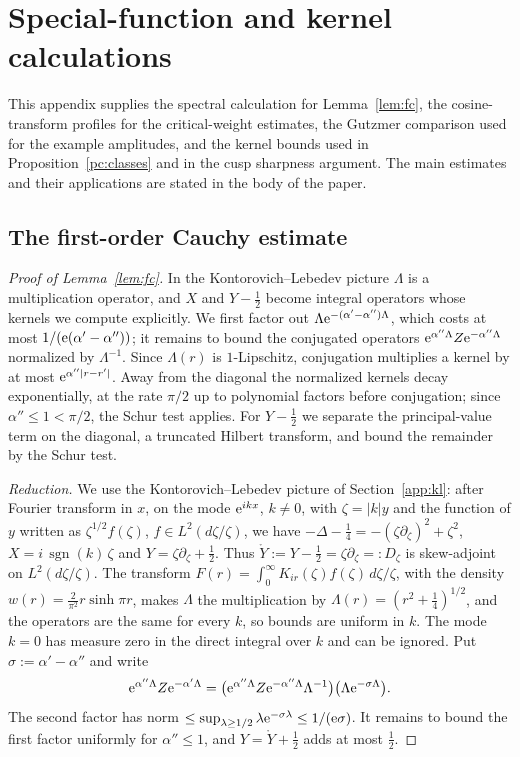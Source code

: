 \section{Special-function and kernel calculations}\label{app:special}
This appendix supplies the spectral calculation for Lemma~\ref{lem:fc}, the cosine-transform profiles
for the critical-weight estimates, the Gutzmer comparison used for the example amplitudes,
and the kernel bounds used in Proposition~\ref{pc:classes} and in the cusp sharpness argument. The main estimates and their applications
are stated in the body of the paper.

\subsection{The first-order Cauchy estimate}\label{app:fc-proof}
\begin{proof}[Proof of Lemma~\ref{lem:fc}]
In the Kontorovich--Lebedev picture $\Lambda$ is a multiplication operator, and $X$ and $Y-\tfrac12$ become integral operators
whose kernels we compute explicitly. We first factor out $\Lambda\mathrm{e}^{-(\alpha'-\alpha'')\Lambda}$, which costs at most
$1/(\mathrm{e}(\alpha'-\alpha''))$; it remains to bound the conjugated operators $\mathrm{e}^{\alpha''\Lambda}Z\mathrm{e}^{-\alpha''\Lambda}$ normalized by
$\Lambda^{-1}$. Since $\Lambda(r)$ is $1$-Lipschitz, conjugation multiplies a kernel by at most $\mathrm{e}^{\alpha''|r-r'|}$. Away from the
diagonal the normalized kernels decay exponentially, at the rate $\pi/2$ up to polynomial factors before conjugation; since
$\alpha''\le1<\pi/2$, the Schur test applies. For $Y-\tfrac12$ we separate the principal-value term on the diagonal, a truncated Hilbert transform, and
bound the remainder by the Schur test.

\medskip\noindent\emph{Reduction.}
We use the Kontorovich--Lebedev picture of Section~\ref{app:kl}: after Fourier transform in $x$, on the mode $\mathrm{e}^{ikx}$, $k\ne0$,
with $\zeta=|k|y$ and the function of $y$ written as $\zeta^{1/2}f(\zeta)$, $f\in L^2(d\zeta/\zeta)$, we have $-\Delta-\tfrac14=-(\zeta\partial_\zeta)^2+\zeta^2$,
$X=i\,\operatorname{sgn}(k)\,\zeta$ and $Y=\zeta\partial_\zeta+\tfrac12$. Thus $\mathring Y:=Y-\tfrac12=\zeta\partial_\zeta=:D_\zeta$ is skew-adjoint on $L^2(d\zeta/\zeta)$.
The transform $F(r)=\int_0^\infty K_{ir}(\zeta)f(\zeta)\,d\zeta/\zeta$, with the density $w(r)=\tfrac{2}{\pi^2}r\sinh\pi r$, makes $\Lambda$ the
multiplication by $\Lambda(r)=(r^2+\tfrac14)^{1/2}$, and the operators are the same for every $k$, so bounds are uniform in $k$. The mode $k=0$ has measure zero in the direct integral over $k$ and can be ignored. Put $\sigma:=\alpha'-\alpha''$ and write
\[
\mathrm{e}^{\alpha''\Lambda}Z\mathrm{e}^{-\alpha'\Lambda}=\bigl(\mathrm{e}^{\alpha''\Lambda}Z\mathrm{e}^{-\alpha''\Lambda}\Lambda^{-1}\bigr)\bigl(\Lambda\mathrm{e}^{-\sigma\Lambda}\bigr).
\]
The second factor has norm $\le\sup_{\lambda\ge1/2}\lambda\mathrm{e}^{-\sigma\lambda}\le1/(\mathrm{e}\sigma)$. It remains to bound the first factor uniformly for $\alpha''\le1$, and $Y=\mathring Y+\tfrac12$ adds at most $\tfrac12$.


\end{proof}
